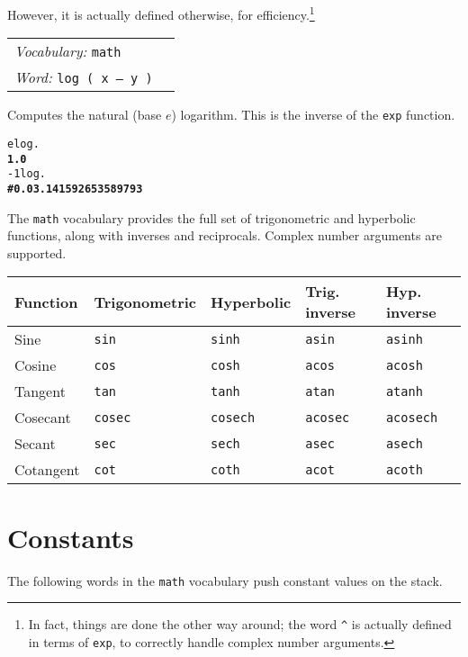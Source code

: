 \documentclass{book}
\newcommand{\tto}{\symbol{123}}
\newcommand{\ttc}{\symbol{125}}
\newcommand{\vocabulary}[1]{\emph{Vocabulary:} \texttt{#1}&\\}
\newcommand{\ordinaryword}[2]{\index{\texttt{#1}}\emph{Word:} \texttt{#2}&\\}
\newcommand{\wordtable}[1]{


\begin{tabularx}{12cm}{lX}
\hline
#1
\hline
\end{tabularx}

}
\begin{document}
However, it is actually defined otherwise, for efficiency.\footnote{In fact, things are done the other way around; the word \texttt{\^{}} is actually defined in terms of \texttt{exp}, to correctly handle complex number arguments.}
\wordtable{
\vocabulary{math}
\ordinaryword{log}{log ( x -- y )}
}
Computes the natural (base $e$) logarithm. This is the inverse of the \texttt{exp} function.
\begin{alltt}
  e log .
\textbf{1.0}
  -1 log .
\textbf{\#\tto 0.0 3.141592653589793 \ttc}
\end{alltt}
The \texttt{math} vocabulary provides the full set of trigonometric and hyperbolic functions, along with inverses and reciprocals. Complex number arguments are supported.


\begin{tabular}{l|l|l|l|l}
Function&Trigonometric&Hyperbolic&Trig. inverse&Hyp. inverse\\
\hline
Sine&\texttt{sin}&\texttt{sinh}&\texttt{asin}&\texttt{asinh}\\
Cosine&\texttt{cos}&\texttt{cosh}&\texttt{acos}&\texttt{acosh}\\
Tangent&\texttt{tan}&\texttt{tanh}&\texttt{atan}&\texttt{atanh}\\
\hline
Cosecant&\texttt{cosec}&\texttt{cosech}&\texttt{acosec}&\texttt{acosech}\\
Secant&\texttt{sec}&\texttt{sech}&\texttt{asec}&\texttt{asech}\\
Cotangent&\texttt{cot}&\texttt{coth}&\texttt{acot}&\texttt{acoth}
\end{tabular}

\section{Constants}

The following words in the \texttt{math} vocabulary push constant values on the stack.

\end{document}
